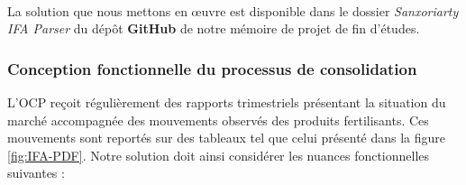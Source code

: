 	\paragraph{}
	La solution que nous mettons en œuvre est disponible dans le dossier \textit{Sanxoriarty IFA Parser} du dépôt \textbf{GitHub} de notre mémoire de projet de fin d'études\cite{this}.
	\subsubsection{Conception fonctionnelle du processus de consolidation}
	L'OCP reçoit régulièrement des rapports trimestriels présentant la situation du marché accompagnée des mouvements observés des produits fertilisants. Ces mouvements sont reportés sur des tableaux tel que celui présenté dans la figure \ref{fig:IFA-PDF}. Notre solution doit ainsi considérer les nuances fonctionnelles suivantes :\newpage

